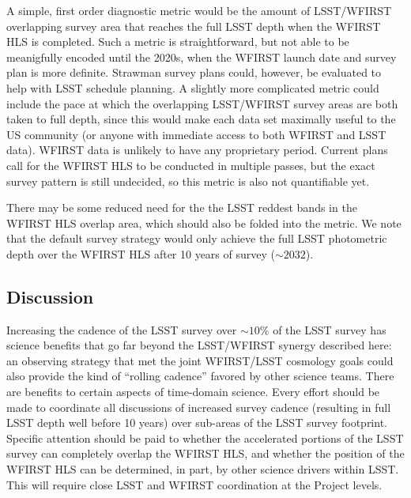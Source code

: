 A simple, first order diagnostic metric would be the amount of LSST/WFIRST
overlapping survey area that reaches the full LSST depth when the WFIRST
HLS is completed.  Such a metric is straightforward, but not
able to be meanigfully encoded until the 2020s, when the WFIRST launch date and survey
plan is more definite.  Strawman survey plans could, however, be
evaluated to help with LSST schedule planning.
A slightly more complicated metric could include
the pace at which the overlapping LSST/WFIRST survey areas are both
taken to full depth, since this would make each data set maximally
useful to the US community (or anyone with immediate access to both
WFIRST and LSST data).  WFIRST data is unlikely to have any proprietary
period.  Current plans call for the WFIRST HLS to be conducted in
multiple passes, but the exact survey pattern is still undecided, so this
metric is also not quantifiable yet.

There may be some reduced need for the the LSST reddest bands in the
WFIRST HLS overlap area, which should also be folded into the metric.
We note that
the default survey strategy would only achieve the full LSST photometric
depth over the WFIRST HLS after 10 years of survey ($\sim2032$).



%
%
%

\subsection{Discussion}
\label{sec:\secname:discussion}

Increasing the cadence of the LSST survey over $\sim10\%$ of the LSST
survey has science benefits that go far beyond the LSST/WFIRST synergy
described here: an observing strategy that met the joint WFIRST/LSST cosmology goals could
also provide the kind of ``rolling cadence'' favored by other science teams.
There are benefits to certain aspects of time-domain
science.  Every effort should be made to coordinate all discussions of
increased survey cadence (resulting in full LSST depth well before 10
years) over sub-areas of the LSST survey footprint.  Specific attention
should be paid to whether the accelerated portions of the LSST survey
can completely overlap the WFIRST HLS, and whether the position of the
WFIRST HLS can be determined, in part, by other science drivers within
LSST.  This will require close LSST and WFIRST coordination at the
Project levels.

